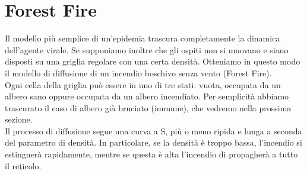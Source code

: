 \documentclass{article}
\begin{document}
    \section{Forest Fire}
    Il modello più semplice di un'epidemia trascura completamente la dinamica dell'agente virale. Se supponiamo inoltre
    che gli ospiti non si muovano e siano disposti su una griglia regolare con una certa densità.
    Otteniamo in questo modo il modello di diffusione di un incendio boschivo senza vento (Forest Fire).\\
    Ogni cella della griglia può essere in uno di tre stati: vuota, occupata da un albero sano oppure occupata da un albero
    incendiato. Per semplicità abbiamo trascurato il caso di albero già bruciato (immune), che vedremo nella prossima sezione.\\
    Il processo di diffusione segue una curva a S, più o meno ripida e lunga a seconda del parametro di densità.
    In particolare, se la densità è troppo bassa, l'incendio si estinguerà rapidamente, mentre se questa è alta l'incendio
    di propagherà a tutto il reticolo.
\end{document}
